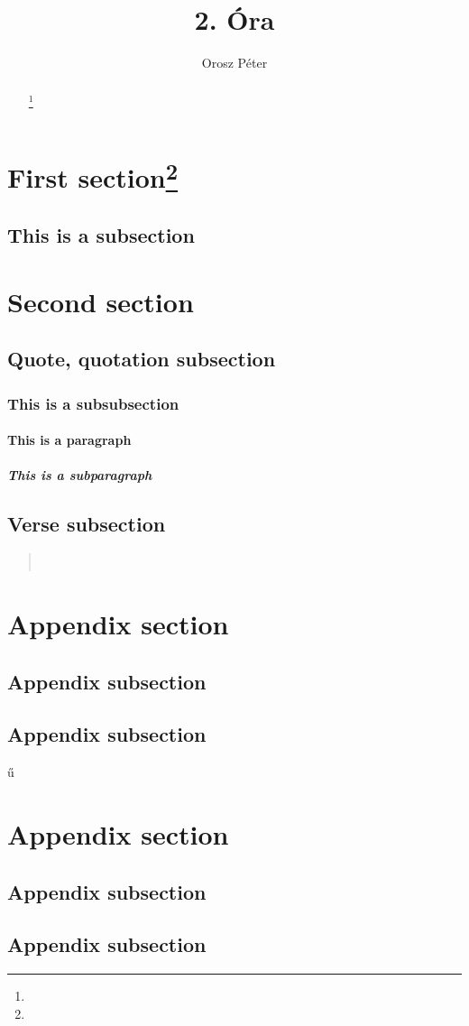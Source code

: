 \documentclass[twocolumn]{article}
\title{2. Óra}
\author{Orosz Péter}
\begin{document}
	\maketitle
	\begin{abstract}
		 \lipsum[1]
		 \footnote{\lipsum[1]}
	\end{abstract}
	\tableofcontents
	\newpage
	\section[Fs]{First section\footnote{\lipsum[1]}}
		\marginpar{\lipsum[1]}
		\subsection{This is a subsection}
			\lipsum[2-3]
	\section{Second section}
		\subsection{Quote, quotation subsection}
			\lipsum[1]
			\begin{quote}
				\lipsum[1]
			\end{quote}
			\lipsum[1]
			\begin{quotation}
				\lipsum[1]
			\end{quotation}
			\subsubsection{This is a subsubsection}
				\paragraph{This is a paragraph}
					\subparagraph{This is a subparagraph}
		\marginpar{\lipsum[1]}
		\subsection{Verse subsection}
			\begin{verse}
				\lipsum[1]\\
				\lipsum[1]
			\end{verse}
	\newpage
	\appendix
	\section{Appendix section}
		\subsection{Appendix subsection}
			\lipsum[1]
		\subsection{Appendix subsection}ű
			\lipsum[1]
	\section{Appendix section}
		\subsection{Appendix subsection}
			\lipsum[1]
		\subsection{Appendix subsection}
			\lipsum[1]
			
\end{document}
